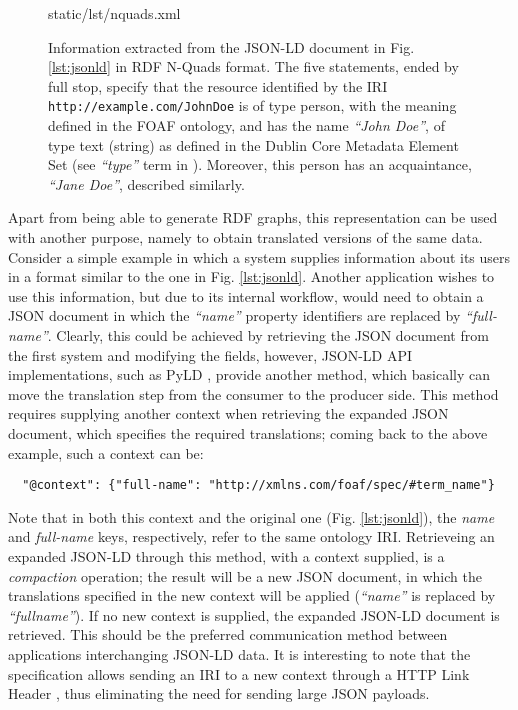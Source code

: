 \begin{figure}[!ht]
  
    {static/lst/nquads.xml}
    \caption[Information extracted from JSON-LD document in RDF N-Quads format]
            {Information extracted from the JSON-LD document in
             Fig. \ref{lst:jsonld} in RDF N-Quads format. The five statements,
             ended by full stop, specify that the resource identified by the IRI
             \texttt{http://example.com/JohnDoe} is of type person, with the
             meaning defined in the FOAF ontology, and has the name
             \textit{``John Doe''}, of type text (string) as defined in the
             Dublin Core Metadata Element Set (see \textit{``type''} term in
             \cite{ref:dc}). Moreover, this person has an acquaintance,
             \textit{``Jane Doe''}, described similarly.}
    \label{lst:nquads}
\end{figure}

Apart from being able to generate RDF graphs, this representation can be used
with another purpose, namely to obtain translated versions of the same data.
Consider a simple example in which a system supplies information about its
users in a format similar to the one in Fig. \ref{lst:jsonld}. Another
application wishes to use this information, but due to its internal workflow,
would need to obtain a JSON document in which
the \textit{``name''} property identifiers are replaced by
\textit{``full-name''}.  Clearly, this could be achieved by retrieving the JSON
document from the first system and modifying the fields, however, JSON-LD API
implementations, such as PyLD \cite{ref:pyld}, provide another method, which
basically can move the translation step from the consumer to the producer side.
This method requires supplying another context when retrieving the expanded JSON
document, which specifies the required translations; coming back to the above
example, such a context can be:
\begin{verbatim}
  "@context": {"full-name": "http://xmlns.com/foaf/spec/#term_name"}
\end{verbatim}

Note that in both this context and the original one (Fig. \ref{lst:jsonld}),
the \textit{name} and \textit{full-name} keys, respectively, refer to the same
ontology IRI. Retrieveing an expanded JSON-LD through this method, with a
context supplied, is a \textit{compaction} operation; the result will be a new
JSON document, in which the translations specified in the new context will be
applied (\textit{``name''} is replaced by \textit{``fullname''}). If no new
context is supplied, the expanded JSON-LD document is retrieved. This should
be the preferred communication method between applications interchanging
JSON-LD data. It is interesting to note that the specification allows sending
an IRI to a new context through a HTTP Link Header \cite{ref:rfc5988}, thus
eliminating the need for sending large JSON payloads.
